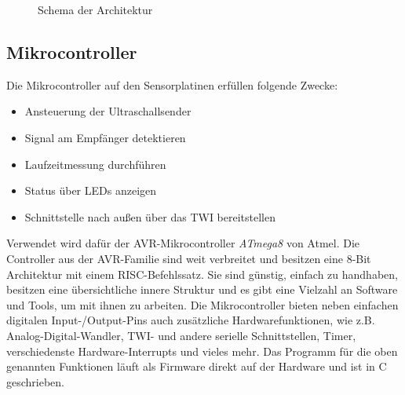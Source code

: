 \begin{figure}[H]
\caption{Schema der Architektur} \label{fig:ARCH}
\end{figure}


\subsection{Mikrocontroller}
Die Mikrocontroller auf den Sensorplatinen erfüllen folgende Zwecke:
\begin{itemize}
	\item Ansteuerung der Ultraschallsender
	\item Signal am Empfänger detektieren
	\item Laufzeitmessung durchführen
	\item Status über LEDs anzeigen
	\item Schnittstelle nach außen über das \ac{TWI} bereitstellen
\end{itemize}
Verwendet wird dafür der AVR-Mikrocontroller \textit{ATmega8} von Atmel. Die Controller aus der AVR-Familie sind weit verbreitet und besitzen eine 8-Bit Architektur mit einem \ac{RISC}-Befehlssatz. Sie sind günstig, einfach zu handhaben, besitzen eine übersichtliche innere Struktur und es gibt eine Vielzahl an Software und Tools, um mit ihnen zu arbeiten. Die Mikrocontroller bieten neben einfachen digitalen Input-/Output-Pins auch zusätzliche Hardwarefunktionen, wie z.B. Analog-Digital-Wandler, \ac{TWI}- und andere serielle Schnittstellen, Timer, verschiedenste Hardware-Interrupts und vieles mehr. Das Programm für die oben genannten Funktionen läuft als Firmware direkt auf der Hardware und ist in C geschrieben.


